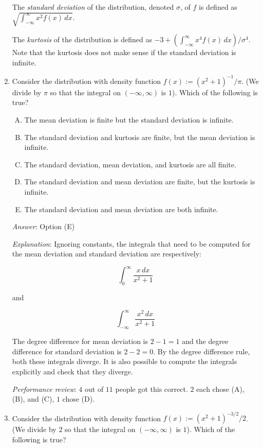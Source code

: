 \documentclass[10pt]{amsart}
\begin{document}
\begin{enumerate}
  The {\em standard deviation} of the distribution, denoted $\sigma$, of $f$ is defined as
  $\sqrt{\int_{-\infty}^\infty x^2 f(x) \, dx}$.

  The {\em kurtosis} of the distribution is defined as $-3 +
  (\int_{-\infty}^\infty x^4 f(x) \, dx)/\sigma^4$. Note that the
  kurtosis does not make sense if the standard deviation is infinite.

\item Consider the distribution with density function $f(x):=
  (x^2+1)^{-1}/\pi$. (We divide by $\pi$ so that the integral on
  $(-\infty,\infty)$ is $1$). Which of the following is true?

  \begin{enumerate}[(A)]
  \item The mean deviation is finite but the standard deviation is infinite.
  \item The standard deviation and kurtosis are finite, but the mean deviation is infinite.
  \item The standard deviation, mean deviation, and kurtosis are all finite.
  \item The standard deviation and mean deviation are finite, but the kurtosis is infinite.
  \item The standard deviation and mean deviation are both infinite.
  \end{enumerate}

  {\em Answer}: Option (E)

  {\em Explanation}: Ignoring constants, the integrals that need to be
  computed for the mean deviation and standard deviation are
  respectively:

  $$\int_0^\infty \frac{x \, dx}{x^2 + 1}$$

  and

  $$\int_{-\infty}^\infty \frac{x^2 \, dx}{x^2 + 1}$$

  The degree difference for mean deviation is $2 - 1 = 1$ and the
  degree difference for standard deviation is $2 - 2 = 0$.  By the
  degree difference rule, both these integrals diverge. It is also
  possible to compute the integrals explicitly and check that they
  diverge.

  {\em Performance review}: $4$ out of $11$ people got this
  correct. $2$ each chose (A), (B), and (C), $1$ chose (D).

\item Consider the distribution with density function $f(x):=
  (x^2+1)^{-3/2}/2$. (We divide by $2$ so that the integral on
  $(-\infty,\infty)$ is $1$). Which of the following is true?


\end{enumerate}
\end{document}
